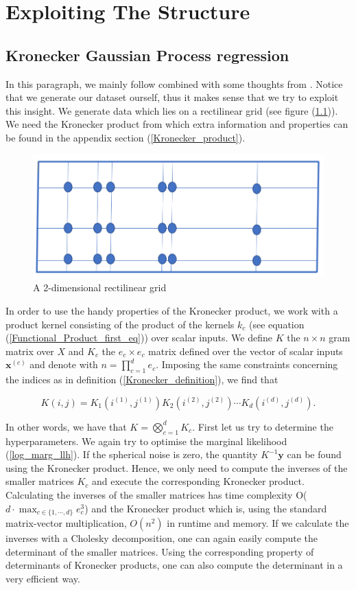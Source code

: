 \documentclass[12pt,a4paper,oneside]{book}
\begin{document}
\chapter{Exploiting The Structure}

\section{Kronecker Gaussian Process regression}

In this paragraph, we mainly follow \cite{saatcci2012scalable} combined with some thoughts from \cite{wilson2015kernel}. Notice that we generate our dataset ourself, thus it makes sense that we try to exploit this insight. We generate data which lies on a rectilinear grid (see figure (\ref{fig:kronecker})). We need the Kronecker product from which extra information and properties can be found in the appendix section (\ref{Kronecker_product}).

\begin{figure}[!htb]
     \centering
     \includegraphics[width=0.4\linewidth]{kronecker}
     \caption{A 2-dimensional rectilinear grid}\label{fig:kronecker}
\end{figure}


In order to use the handy properties of the Kronecker product, we work with a product kernel consisting of the product of the kernels $k_c$  (see equation (\ref{Functional_Product_first_eq})) over scalar inputs. We define $K$ the $n \times n$ gram matrix over $X$ and $K_c$ the $e_c \times e_c$ matrix defined over the vector of scalar inputs $\bm{x}^{(c)}$ and denote with $n = \prod_{c=1}^d e_c$. Imposing the same constraints concerning the indices as in definition (\ref{Kronecker_definition}), we find that  

\begin{equation}\label{Kronecker1}
K(i,j) = K_1(i^{(1)},j^{(1)})K_2(i^{(2)},j^{(2)}) \cdots K_d(i^{(d)},j^{(d)}). 
\end{equation}

In other words, we have that $K = \bigotimes_{c=1}^d K_c$. First let us try to determine the hyperparameters. We again try to optimise the marginal likelihood (\ref{log_marg_llh}). If the spherical noise is zero, the quantity $K^{-1} \bm{y}$ can be found using the Kronecker product. Hence, we only need to compute the inverses of the smaller matrices $K_c$ and execute the corresponding Kronecker product. Calculating the inverses of the smaller matrices has time complexity O($ d \cdot \max\nolimits_{c \in \{1,\cdots,d\}} e_c^3$) and the Kronecker product which is, using the standard matrix-vector multiplication, $O(n^2)$ in runtime and memory. If we calculate the inverses with a Cholesky decomposition, one can again easily compute the determinant of the smaller matrices. Using the corresponding property of determinants of Kronecker products, one can also compute the determinant in a very efficient way. 
\end{document}
